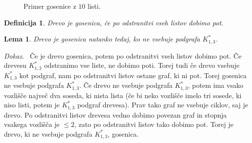 \documentclass[a4paper, 12pt]{book}
\newtheorem{definicija}{Definicija}[chapter]
\newtheorem{lema}{Lema}[chapter]
\newenvironment{dokaz}{\emph{Dokaz.}\ }{\hspace{\fill}{$\Box$}}
\begin{document}
\begin{figure}[h]
    \begin{center}        
    \end{center}
    \caption{Primer gosenice z $10$ listi.}
    \label{graf_gosenice_10_listov}
\end{figure}

\begin{definicija}
    Drevo je gosenica, če po odstranitvi vseh listov dobimo pot.
\end{definicija}

\begin{lema}
\label{lema_gosenica_ne_vsebuje_k13}
    Drevo je gosenica natanko tedaj, ko ne vsebuje podgrafa $K_{1,3}^*$.
\end{lema}
\begin{dokaz}
    Če je drevo gosenica, potem po odstranitvi vseh listov dobimo pot. Če drevesu $K_{1,3}^*$ odstranimo vse liste, ne dobimo poti. Torej tudi če drevo vsebuje $K_{1,3}^*$ kot podgraf, nam po odstranitvi listov ostane graf, ki ni pot. Torej gosenica ne vsebuje podgrafa $K_{1,3}^*$. Če drevo ne vsebuje podgrafa $K_{1,3}^*$, potem ima vsako vozlišče največ dva soseda, ki nista lista (če bi neko vozlišče imelo tri sosede, ki niso listi, potem je $K_{1,3}^*$ podgraf drevesa). Prav tako graf ne vsebuje ciklov, saj je drevo. Po odstranitvi listov drevesa vedno dobimo povezan graf in stopnja vsakega vozlišča je $\leq 2$, zato po odstranitvi listov tako dobimo pot. Torej je drevo, ki ne vsebuje podgrafa $K_{1,3}^*$, gosenica.
\end{dokaz}
\end{document}
